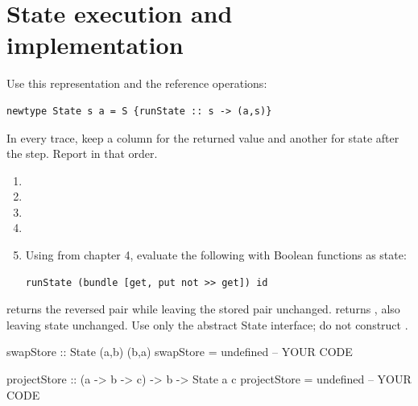 \chapter{State execution and implementation}
Use this representation and the reference operations:
\par\noindent\begin{minipage}{\linewidth}
\begin{lstlisting}
newtype State s a = S {runState :: s -> (a,s)}
\end{lstlisting}
\end{minipage}\par
In every trace, keep a column for the returned value and another for
state after the step. Report  in that order.

\begin{enumerate}[label=(\alph*)]
\item {}
\item {}
\item {}
\item {}
\item Using  from chapter 4, evaluate
the following with Boolean functions as state:
\par\noindent\begin{minipage}{\linewidth}
\begin{lstlisting}
runState (bundle [get, put not >> get]) id
\end{lstlisting}
\end{minipage}\par
{}
\end{enumerate}

 returns the reversed pair while leaving the stored pair
unchanged.  returns , also leaving
state unchanged. Use only the abstract State interface; do not construct .
\par\noindent\begin{minipage}{\linewidth}
\begin{codeanswer}
swapStore :: State (a,b) (b,a)
swapStore = undefined  -- YOUR CODE

projectStore :: (a -> b -> c) -> b -> State a c
projectStore = undefined  -- YOUR CODE
\end{codeanswer}
\end{minipage}\par
{}

